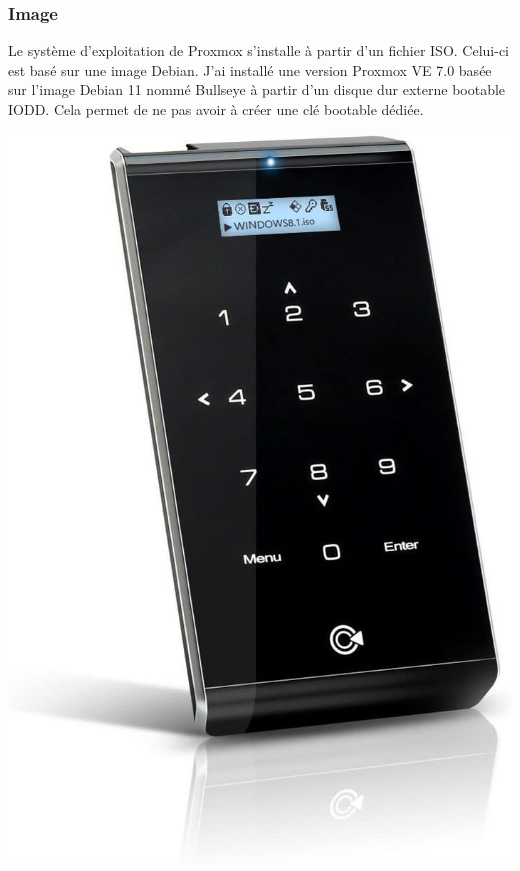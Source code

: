 \documentclass[12pt, a4paper, twoside]{article}
\begin{document}
\subsubsection{Image}
\noindent%
\begin{minipage}{.7\textwidth}%
Le système d'exploitation de \gls{Proxmox} s'installe à partir d'un fichier \gls{ISO}. 
Celui-ci est basé sur une image \gls{Debian}. 
J'ai installé une version \gls{Proxmox} VE 7.0 basée sur l'image \gls{Debian} 11 nommé Bullseye à partir d'un disque dur externe bootable IODD. 
Cela permet de ne pas avoir à créer une clé bootable dédiée.

\end{minipage}%
\hfill
\begin{minipage}{.3\textwidth}%
\begin{center}
\includegraphics[scale=0.1]{src/img_disk_iodd.jpg}
\end{center}
\end{minipage}%
\end{document}
